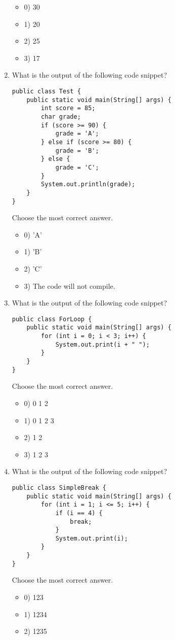 \documentclass[12pt]{article}
\begin{document}
\begin{enumerate}[label=(\arabic*)]
\begin{itemize}
\item 0) 30
\item 1) 20
\item 2) 25
\item 3) 17
\end{itemize}
\item What is the output of the following code snippet?\n\begin{verbatim}
public class Test {
    public static void main(String[] args) {
        int score = 85;
        char grade;
        if (score >= 90) {
            grade = 'A';
        } else if (score >= 80) {
            grade = 'B';
        } else {
            grade = 'C';
        }
        System.out.println(grade);
    }
}
\end{verbatim}
Choose the most correct answer. 
\begin{itemize}
\item 0) 'A'
\item 1) 'B'
\item 2) 'C'
\item 3) The code will not compile.
\end{itemize}
\item What is the output of the following code snippet?\n\begin{verbatim}
public class ForLoop {
    public static void main(String[] args) {
        for (int i = 0; i < 3; i++) {
            System.out.print(i + " ");
        }
    }
}
\end{verbatim}
Choose the most correct answer. 
\begin{itemize}
\item 0) 0 1 2 
\item 1) 0 1 2 3 
\item 2) 1 2 
\item 3) 1 2 3 
\end{itemize}
\item What is the output of the following code snippet?\n\begin{verbatim}
public class SimpleBreak {
    public static void main(String[] args) {
        for (int i = 1; i <= 5; i++) {
            if (i == 4) {
                break;
            }
            System.out.print(i);
        }
    }
}
\end{verbatim}
Choose the most correct answer. 
\begin{itemize}
\item 0) 123
\item 1) 1234
\item 2) 1235

\end{itemize}
\end{enumerate}
\end{document}
